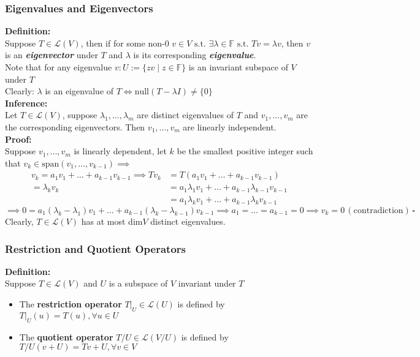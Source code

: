 \documentclass{article}
\newcommand{\F}{\mathbb{F}}
\newcommand{\st}{\mbox{ s.t. }}
\newcommand{\0}{{\bf{0}}}
\begin{document}
\subsubsection{Eigenvalues and Eigenvectors}
\textbf{Definition:}\\
Suppose $T\in\mathcal{L}(V)$, then if for some non-0 $v\in V\st\exists\lambda\in\F\st Tv=\lambda v$, then $v$ is an \textit{\textbf{eigenvector }}under $T$ and $\lambda$ is its corresponding \textit{\textbf{eigenvalue}}.\\
Note that for any eigenvalue $v:U:=\{zv\mid z\in\F\}$ is an invariant subspace of $V$ under $T$\\
Clearly: $\lambda$ is an eigenvalue of $T\iff\mbox{null}(T-\lambda I)\neq\{0\}$\\
\textbf{Inference:}\\
Let $T\in\mathcal{L}(V)$, suppose $\lambda_1,\dots,\lambda_m$ are distinct eigenvalues of $T$ and $v_1,\dots,v_m$ are the corresponding eigenvectors. Then $v_1,\dots,v_m$ are linearly independent.\\
\textbf{Proof:}\\
Suppose $v_1,\dots,v_m$ is linearly dependent, let $k$ be the smallest positive integer such that $v_k\in\mbox{span}(v_1,\dots,v_{k-1})\implies$
\begin{equation}
\begin{split}
    v_k=a_1v_1+\dots+a_{k-1}v_{k-1}\implies Tv_k&=T(a_1v_1+\dots+a_{k-1}v_{k-1})\\
    =\lambda_kv_k&=a_1\lambda_1v_1+\dots+a_{k-1}\lambda_{k-1}v_{k-1}\\
    &=a_1\lambda_kv_1+\dots+a_{k-1}\lambda_kv_{k-1}
\end{split}
\end{equation}
$$\implies0=a_1(\lambda_k-\lambda_1)v_1+\dots+a_{k-1}(\lambda_k-\lambda_{k-1})v_{k-1}\implies a_1=\dots=a_{k-1}=0\implies v_k=0\,(\mbox{contradiction})\,\square$$
Clearly, $T\in\mathcal{L}(V)$ has at most dim$V$ distinct eigenvalues.\\
\subsubsection{Restriction and Quotient Operators}
\textbf{Definition:}\\
Suppose $T\in\mathcal{L}(V)$ and $U$ is a subspace of $V$ invariant under $T$
\begin{itemize}
    \item The \textbf{restriction operator} $T|_U\in\mathcal{L}(U)$ is defined by $T|_U(u)=T(u),\forall u\in U$
    \item The \textbf{quotient operator} $T/U\in\mathcal{L}(V/U)$ is defined by $T/U(v+U)=Tv+U,\forall v\in V$
\end{itemize}
\end{document}
